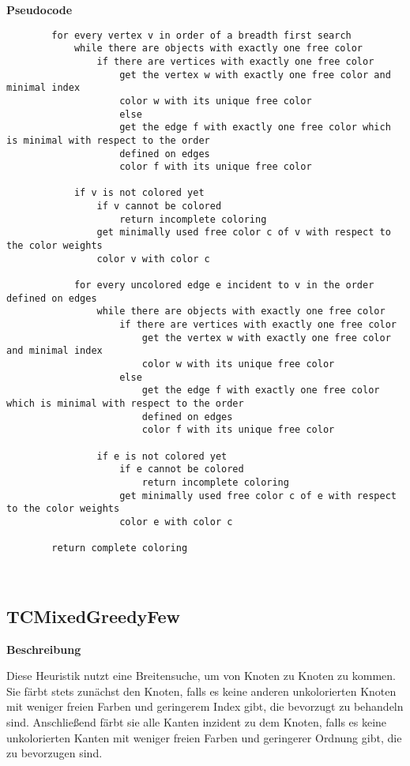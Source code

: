 \documentclass{article}
\begin{document}
	\textbf{Pseudocode}
	\begin{verbatim}
		for every vertex v in order of a breadth first search
		    while there are objects with exactly one free color
		        if there are vertices with exactly one free color
		            get the vertex w with exactly one free color and minimal index
		            color w with its unique free color
			        else
		            get the edge f with exactly one free color which is minimal with respect to the order
		            defined on edges
		            color f with its unique free color
		
		    if v is not colored yet
		        if v cannot be colored
		            return incomplete coloring
		        get minimally used free color c of v with respect to the color weights
		        color v with color c
			    
		    for every uncolored edge e incident to v in the order defined on edges
		        while there are objects with exactly one free color
		            if there are vertices with exactly one free color
		                get the vertex w with exactly one free color and minimal index
		                color w with its unique free color
		            else
		                get the edge f with exactly one free color which is minimal with respect to the order 
		                defined on edges
		                color f with its unique free color
				    
		        if e is not colored yet
		            if e cannot be colored
		                return incomplete coloring
		            get minimally used free color c of e with respect to the color weights
		            color e with color c
				        
		return complete coloring
	\end{verbatim}
	
	~\newpage
	
	\subsection{TCMixedGreedyFew}
	
	\textbf{Beschreibung}
	
	Diese Heuristik nutzt eine Breitensuche, um von Knoten zu Knoten zu kommen. Sie färbt stets zunächst den Knoten, falls es keine anderen unkolorierten Knoten mit weniger freien Farben und geringerem Index gibt, die bevorzugt zu behandeln sind. Anschließend färbt sie alle Kanten inzident zu dem Knoten, falls es keine unkolorierten Kanten mit weniger freien Farben und geringerer Ordnung gibt, die zu bevorzugen sind.
	
\end{document}
